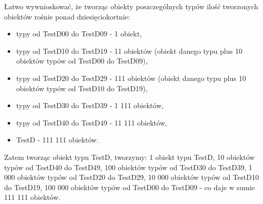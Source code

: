 \documentclass[12pt]{article}
\begin{document}
Łatwo wywnioskować, że tworząc obiekty poszczególnych typów ilość tworzonych obiektów rośnie ponad dziesięciokortnie:
\begin{itemize}
	\item typy od TestD00 do TestD09 - 1 obiekt,
	\item typy od TestD10 do TestD19 - 11 obiektów (obiekt danego typu plus 10 obiektów typów od TestD00 do TestD09),
	\item typy od TestD20 do TestD29 - 111 obiektów (obiekt danego typu plus 10 obiektów typów od TestD10 do TestD19),
	\item typy od TestD30 do TestD39 - 1 111 obiektów,
	\item  typy od TestD40 do TestD49 - 11 111 obiektów,
	\item TestD - 111 111 obiektów.
\end{itemize}
Zatem tworząc obiekt typu TestD, tworzymy: 1 obiekt typu TestD, 10 obiektów typów od TestD40 do TestD49, 100 obiektów typów od TestD30 do TestD39, 1 000 obiektów typów od TestD20 do TestD29, 10 000 obiektów typów od TestD10 do TestD19, 100 000 obiektów typów od TestD00 do TestD09 - co daje w sumie 111 111 obiektów.
\end{document}
